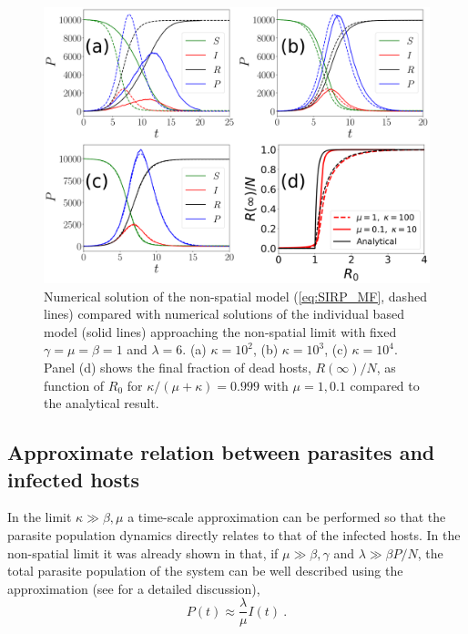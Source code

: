 \begin{figure}[H]
    \centering
    \includegraphics[width=\columnwidth]{Figures/MF_comparison.png}
    \caption[
        Comparison between the non-spatial model and the individual based model
        in the high mobility limit
    ]{Numerical solution of the non-spatial model (\cref{eq:SIRP_MF},
        dashed lines) compared with numerical solutions of the individual based
        model
        (solid lines) approaching the non-spatial limit with fixed
        $\gamma=\mu=\beta=1$
        and $\lambda=6$. (a) $\kappa=10^2$, (b) $\kappa=10^3$, (c)
        $\kappa=10^4$. Panel
        (d) shows the final fraction of dead hosts, $R(\infty)/N$, as function
        of $R_0$
        for $\kappa/(\mu+\kappa)=0.999$ with $\mu=1,0.1$ compared to the
        analytical
        result.}
    \label{fig:MF_limit}
\end{figure}

\subsection{Approximate relation between parasites and infected hosts}

In the limit $\kappa\gg\beta,\mu$ a time-scale approximation can be
performed so that the parasite population dynamics directly relates to that of
the infected hosts. In the non-spatial limit it was already shown in
\cite{GimenezRomero2021} that, if  $\mu\gg\beta,\gamma$ and $\lambda\gg\beta
    P/N$, the total parasite population of the system can be well described
using
the approximation (see \cite{GimenezRomero2021} for a detailed discussion),
\begin{equation}\label{eq:P_approx_II}
    P(t)\approx \frac{\lambda}{\mu} I(t) \ .
\end{equation}

